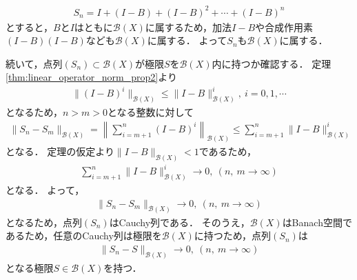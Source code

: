 \begin{Proof}
\begin{align*}
  S_n = I + ( I - B) + ( I - B )^2 + \cdots + ( I - B )^n
\end{align*}
とすると，$B$と$I$はともに${\mathcal B}(X)$に属するため，加法$I - B$や合成作用素$(I - B)(I - B)$なども${\mathcal B}(X)$に属する．
よって$S_n$も${\mathcal B}(X)$に属する．

続いて，点列$(S_n) \subset {\mathcal B}(X)$が極限$S$を${\mathcal B}(X)$内に持つか確認する．
定理\ref{thm:linear_operator_norm_prop2}より
\begin{align*}
  \| (I - B)^i \|_{{\mathcal B}(X)} \le \| I - B \|_{{\mathcal B}(X)}^i, ~ i = 0, 1, \cdots
\end{align*}
となるため，$n > m > 0$となる整数に対して
\begin{align*}
  \| S_n - S_m \|_{{\mathcal B}(X)} = \left\| \sum_{i = m + 1}^n  ( I - B )^i \right\|_{{\mathcal B}(X)} \le \sum_{i = m + 1}^n \| I - B \|_{{\mathcal B}(X)}^i
\end{align*}
となる．
定理の仮定より$ \| I - B \|_{{\mathcal B}(X)} < 1$であるため，
\begin{align*}
  \sum_{i = m + 1}^n \| I - B \|_{{\mathcal B}(X)}^i \rightarrow 0, ~ (n, ~ m \rightarrow \infty )
\end{align*}
となる．
よって，
\begin{align*}
  \| S_n - S_m \|_{{\mathcal B}(X)} \rightarrow 0, ~ (n, ~ m \rightarrow \infty )
\end{align*}
となるため，点列$(S_n)$はCauchy列である．
そのうえ，${\mathcal B}(X)$はBanach空間であるため，任意のCauchy列は極限を${\mathcal B}(X)$に持つため，点列$(S_n)$は
\begin{align*}
  \| S_n - S \|_{{\mathcal B}(X)} \rightarrow 0, ~ (n, ~ m \rightarrow \infty )
\end{align*}
となる極限$S \in {\mathcal B}(X)$を持つ．


\end{Proof}
